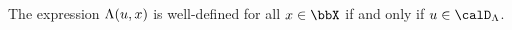 \begin{lemma}
  \label{lemma:odeSpace-rationale}
  The expression $\Lambda(u, x)$ is well-defined for all $\stateVar \in \stateSpace$ if and only if $\momentVar \in \odeSpace$.
\end{lemma}

